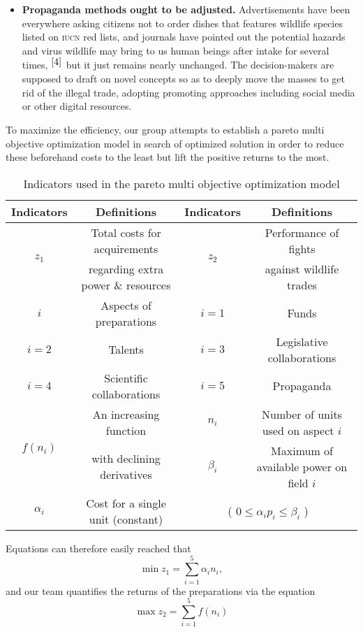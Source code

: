 \documentclass[12pt]{article}
\begin{document}
\begin{itemize}
	\item \textbf{Propaganda methods ought to be adjusted.} Advertisements have been everywhere asking citizens not to order dishes that features wildlife species listed on \textsc{iucn} red lists, and journals have pointed out the potential hazards and virus wildlife may bring to us human beings after intake for several times, $^{\cite{4}}$ but it just remains nearly unchanged. The decision-makers are supposed to draft on novel concepts so as to deeply move the masses to get rid of the illegal trade, adopting promoting approaches including social media or other digital resources.
\end{itemize}

To maximize the efficiency, our group attempts to establish a pareto multi objective optimization model in search of optimized solution in order to reduce these beforehand costs to the least but lift the positive returns to the most.

\clearpage

\begin{table}[htbp]
\centering
	\begin{tabular}{|c|c|c|c|}
			\hline
			Indicators & Definitions & Indicators & Definitions\\
			\hline
			\multirow{2}{*}{$z_1$} & Total costs for acquirements & \multirow{2}{*}{$z_2$} & Performance of fights\\
			& regarding extra power \& resources && against wildlife trades\\
			\hline
			$i$ & Aspects of preparations & $i=1$ & Funds\\
			\hline
			$i=2$ & Talents & $i=3$ & Legislative collaborations \\
			\hline
			$i=4$ & Scientific collaborations &$i=5$ &Propaganda\\
			\hline
			\multirow{2}{*}{$f(n_i)$}& An increasing function &$n_i$& Number of units used on aspect $i$\\
			\cline{3-4}
			&with declining derivatives&$\beta_i$ & Maximum of available power on field $i$\\
			\hline
			$\alpha_i$ & Cost for a single unit (constant) & \multicolumn{2}{c|}{( $0\leq\alpha_ip_i\leq\beta_i$ )}\\
			\hline
	\end{tabular}
	\caption{Indicators used in the pareto multi objective optimization model}
\end{table}
Equations can therefore easily reached that
\begin{equation}
	\min z_1=\sum_{i=1}^5\alpha _i n_i,
\end{equation}
and our team quantifies the returns of the preparations via the equation
\begin{equation}
	\max z_2=\sum_{i=1}^5f(n_i)
\end{equation}
\end{document}
